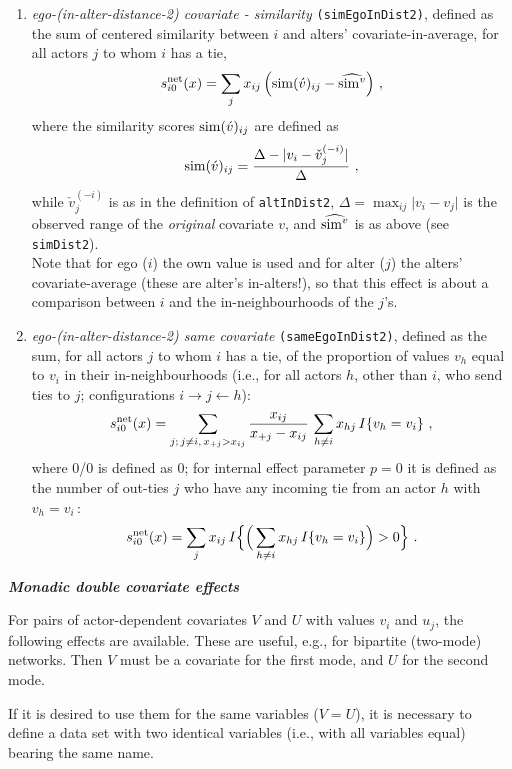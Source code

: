\documentclass[a4paper,fleqn,11pt]{article}
\newcommand{\+}{\, + \,}
\newcommand{\vit}{\theenumi}
\newcounter{savenumi}
\begin{document}
\begin{enumerate}
\item \emph{ego-(in-alter-distance-2) covariate - similarity} \texttt{(simEgoInDist2)},
      defined as the sum of centered similarity  between $i$
      and alters' covariate-in-average, for all actors
      $j$ to whom $i$ has a tie,
\[
 s^{\rm net}_{i\vit}(x) = \sum_j x_{ij}\, \Big({\rm sim}(\acute v)_{ij}
  - \widehat{{\rm sim}^v} \Big) \ ,
\]
 where the similarity scores ${\rm sim}(\acute v)_{ij}$ are defined as
\[
{\rm sim}(\acute v)_{ij}=
 \frac{\Delta-\vert  v_i - \check v_j^{(-i)} \vert}{\Delta} \ ,
\]
 while
 $ \check v_j^{(-i)}$ is as in the definition of \texttt{altInDist2},
 $\Delta=\max_{ij}\vert v_i - v_j \vert$ is the observed range of the
 \emph{original} covariate $v$, and $\widehat{{\rm sim}^v}$ is as above
 (see \texttt{simDist2}).\\
  Note that for ego ($i$) the own value is used and for alter ($j$) the alters' covariate-average
  (these are alter's in-alters!), so that this effect is about a comparison between $i$
   and the in-neighbourhoods of the $j$'s.

\item \emph{ego-(in-alter-distance-2) same covariate} \texttt{(sameEgoInDist2)},
      defined as the sum, for all actors $j$ to whom $i$ has a tie,
      of the proportion of values $v_h$ equal to $v_i$
      in their in-neighbourhoods (i.e., for all actors $h$, other than $i$,
       who send ties to $j$; configurations $i \rightarrow j \leftarrow h$):
\[
 s^{\rm net}_{i\vit}(x) = \sum_{j;\, j \neq i, \, x_{+j} > x_{ij} } \frac{x_{ij}}{x_{+j} - x_{ij}}
                        \, \sum_{h \neq i} x_{hj}\, I\{v_h = v_i\} \ ,
\]
where 0/0 is defined as 0; for internal effect parameter $p=0$ it is defined
as the number of out-ties $j$ who have any incoming tie from an actor $h$
with $v_h = v_i\,$:
\[
 s^{\rm net}_{i\vit}(x) = \sum_j x_{ij}\,
                I\Big\{  \Big( \sum_{h \neq i} x_{hj}\, I\{v_h = v_i\} \Big) > 0 \Big\} \ .
\]

\setcounter{savenumi}{\value{enumi}}
\end{enumerate}


\noindent
\textbf{\emph{Monadic double covariate effects}}
\medskip


\noindent
For pairs of actor-dependent covariates $V$ and $U$ with values  $v_i$ and $u_j$,
the following effects are available.
These are useful, e.g., for bipartite (two-mode) networks.
 Then $V$ must be a covariate for the first mode, and $U$ for the second mode.

If it is desired to use them for the same variables ($V = U$),
it is necessary to define a data set with two identical variables
(i.e., with all variables equal) bearing the same name.
\end{document}
